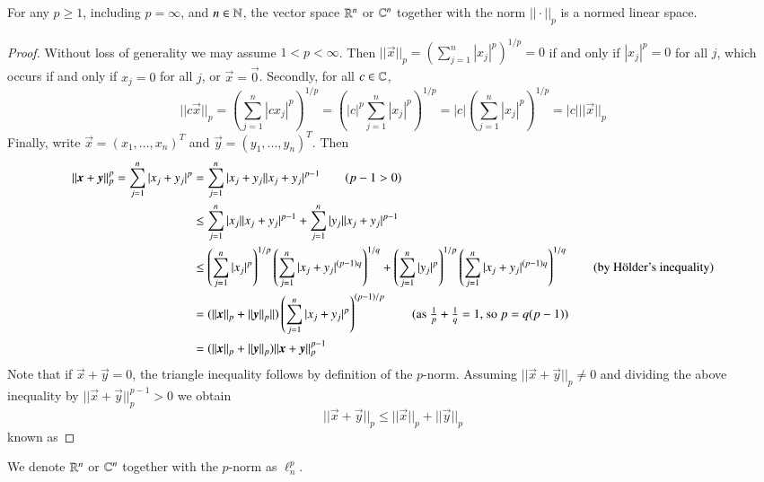 \begin{thm}
    For any $p \geq 1$, including $p  = \infty$, and $n \in \mathbb N$, the vector space $\mathbb R^n$ or $\mathbb C^n$ together with the norm $||\cdot||_p$ is a normed linear space.
\end{thm}
\begin{proof}
    Without loss of generality we may assume $1 < p < \infty$. Then $||\vec{x}||_p = \left(\sum_{j=1}^n|x_j|^p\right)^{1/p} = 0$ if and only if $|x_j|^p = 0$ for all $j$, which occurs if and only if $x_j = 0$ for all $j$, or $\vec{x} = \vec{0}$. Secondly, for all $c \in \mathbb C$, $$||c\vec{x}||_p = \left(\sum_{j=1}^n|cx_j|^p\right)^{1/p} = \left(|c|^p\sum_{j=1}^n|x_j|^p\right)^{1/p} = |c|\left(\sum_{j=1}^n|x_j|^p\right)^{1/p} = |c|||\vec{x}||_p$$
    Finally, write $\vec{x} = (x_1,...,x_n)^T$ and $\vec{y} = (y_1,...,y_n)^T$. Then \begin{align*}
        ||\vec{x}+\vec{y}||_p^p = \sum_{j=1}^n|x_j+y_j|^p &= \sum_{j=1}^n|x_j+y_j||x_j+y_j|^{p-1} \tag{$p-1 > 0$} \\
        &\leq \sum_{j=1}^n|x_j||x_j+y_j|^{p-1} + \sum_{j=1}^n|y_j||x_j+y_j|^{p-1} \\
        &\leq \left(\sum_{j=1}^n|x_j|^p\right)^{1/p}\left(\sum_{j=1}^n|x_j+y_j|^{(p-1)q}\right)^{1/q}+\left(\sum_{j=1}^n|y_j|^p\right)^{1/p}\left(\sum_{j=1}^n|x_j+y_j|^{(p-1)q}\right)^{1/q} \tag{by H\"{o}lder's inequality} \\
        &= (||\vec{x}||_p + ||\vec{y}||_p||)\left(\sum_{j=1}^n|x_j+y_j|^p\right)^{(p-1)/p} \tag{as $\frac{1}{p}+\frac{1}{q} = 1$, so $p = q(p-1)$} \\
        &= (||\vec{x}||_p+||\vec{y}||_p)||\vec{x}+\vec{y}||_p^{p-1}
    \end{align*}
    Note that if $\vec{x}+\vec{y} = 0$, the triangle inequality follows by definition of the $p$-norm. Assuming $||\vec{x}+\vec{y}||_p \neq 0$ and dividing the above inequality by $||\vec{x}+\vec{y}||_p^{p-1} > 0$ we obtain $$||\vec{x} + \vec{y}||_p \leq ||\vec{x}||_p + ||\vec{y}||_p$$ known as 
\end{proof}

\begin{defn}
    We denote $\mathbb R^n$ or $\mathbb C^n$ together with the $p$-norm as $\ell_n^p$.
\end{defn}


